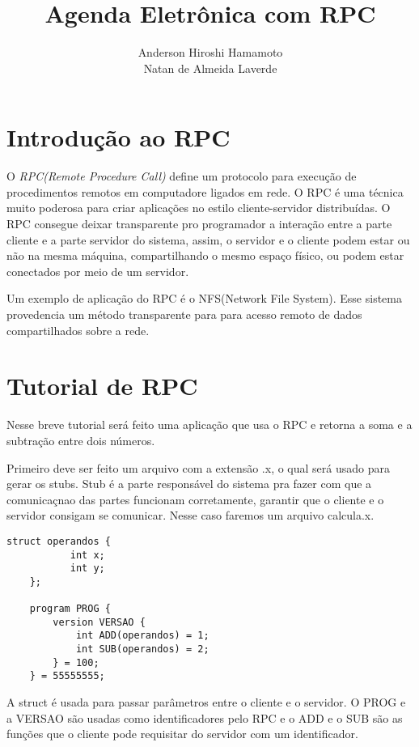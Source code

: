 \documentclass[12pt,a4paper]{article}
\author{Anderson Hiroshi Hamamoto \\ Natan de Almeida Laverde}
\date{}
\title{Agenda Eletrônica com RPC}
\begin{document}
\maketitle

\section{Introdução ao RPC}

O \textit{RPC(Remote Procedure Call)}\cite{rfc1050} define um protocolo para execução de procedimentos
remotos em computadore ligados em rede\cite{penta2}. O RPC é uma técnica muito poderosa para
criar aplicações no estilo cliente-servidor distribuídas\cite{marshall}. O RPC consegue deixar
transparente pro programador a interação entre a parte cliente e a parte servidor do 
sistema, assim, o servidor e o cliente podem estar ou não na mesma máquina, compartilhando
o mesmo espaço físico, ou podem estar conectados por meio de um servidor. 

Um exemplo de aplicação do RPC é o NFS(Network File System)\cite{rfc1094}.
Esse sistema provedencia um método transparente para para acesso remoto de dados 
compartilhados sobre a rede.

\section{Tutorial de RPC}

Nesse breve tutorial será feito uma aplicação que usa o RPC e retorna a soma e a subtração 
entre dois números.

Primeiro deve ser feito um arquivo com a extensão .x, o qual será usado para gerar os stubs. 
Stub é a parte responsável do sistema pra fazer com que a comunicaçnao das partes funcionam
corretamente, garantir que o cliente e o servidor consigam se comunicar. Nesse caso faremos
um arquivo calcula.x.

\lstset{language=C}
\begin{lstlisting}[caption=calcula.x]
	struct operandos {
	       int x;
	       int y;
	};

	program PROG {
		version VERSAO {
			int ADD(operandos) = 1;
			int SUB(operandos) = 2;
		} = 100;
	} = 55555555;
\end{lstlisting}

A struct é usada para passar parâmetros entre o cliente e o servidor. O PROG e a VERSAO
são usadas como identificadores pelo RPC e o ADD e o SUB são as funções que o cliente pode
requisitar do servidor com um identificador.
\end{document}
